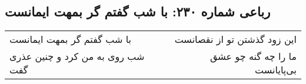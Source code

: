 \begin{center}
\section*{رباعی شماره ۲۳۰: با شب گفتم گر بمهت ایمانست}
\label{sec:0230}
\begin{longtable}{l p{0.5cm} r}
با شب گفتم گر بمهت ایمانست
&&
این زود گذشتن تو از نقصانست
\\
شب روی به من کرد و چنین عذری گفت
&&
ما را چه گنه چو عشق بی‌پایانست
\\
\end{longtable}
\end{center}
